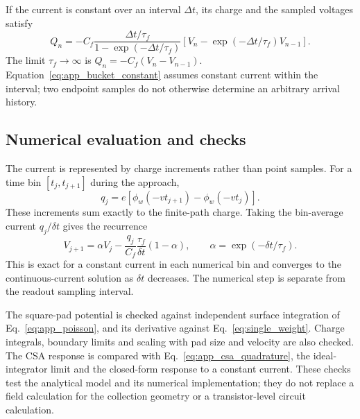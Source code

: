 \documentclass[11pt,a4paper]{article}
\begin{document}
If the current is constant over an interval $\Delta t$, its charge and the sampled voltages satisfy
\begin{equation}
 Q_n=-C_f\frac{\Delta t/\tau_f}{1-\exp(-\Delta t/\tau_f)}
 \left[V_n-\exp(-\Delta t/\tau_f)V_{n-1}\right].
 \label{eq:app_bucket_constant}
\end{equation}
The limit $\tau_f\to\infty$ is $Q_n=-C_f(V_n-V_{n-1})$. Equation~\eqref{eq:app_bucket_constant} assumes constant current within the interval; two endpoint samples do not otherwise determine an arbitrary arrival history.

\subsection{Numerical evaluation and checks}

The current is represented by charge increments rather than point samples. For a time bin $[t_j,t_{j+1}]$ during the approach,
\begin{equation}
 q_j=e[\phi_w(-vt_{j+1})-\phi_w(-vt_j)].
\end{equation}
These increments sum exactly to the finite-path charge. Taking the bin-average current $q_j/\delta t$ gives the recurrence
\begin{equation}
 V_{j+1}=\alpha V_j
 -\frac{q_j}{C_f}\frac{\tau_f}{\delta t}(1-\alpha),
 \qquad \alpha=\exp(-\delta t/\tau_f).
 \label{eq:app_recurrence}
\end{equation}
This is exact for a constant current in each numerical bin and converges to the continuous-current solution as $\delta t$ decreases. The numerical step is separate from the readout sampling interval.

The square-pad potential is checked against independent surface integration of Eq.~\eqref{eq:app_poisson}, and its derivative against Eq.~\eqref{eq:single_weight}. Charge integrals, boundary limits and scaling with pad size and velocity are also checked. The CSA response is compared with Eq.~\eqref{eq:app_csa_quadrature}, the ideal-integrator limit and the closed-form response to a constant current. These checks test the analytical model and its numerical implementation; they do not replace a field calculation for the collection geometry or a transistor-level circuit calculation.








\end{document}
